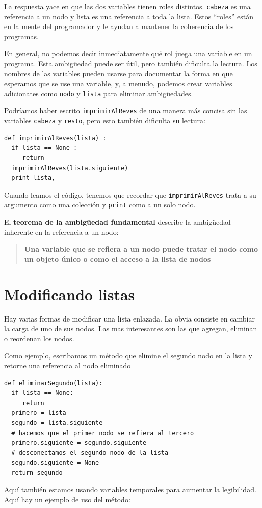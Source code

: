 La respuesta yace en que las dos variables tienen roles distintos. 
\texttt{cabeza} es una referencia a un nodo y lista es una referencia 
a toda la lista. Estos ``roles'' están en la mente del programador y 
le ayudan a mantener la coherencia de los programas.


En general, no podemos decir inmediatamente qué rol juega una variable
en un programa. Esta ambigüedad puede ser útil, pero también dificulta
la lectura. Los nombres de las variables pueden usarse para documentar
la forma en que esperamos que se use una variable, y, a menudo, podemos
crear variables adicionates como \texttt{nodo} y \texttt{lista} para 
eliminar ambigüedades.

Podríamos haber escrito  \texttt{imprimirAlReves} de una manera más
concisa sin las variables \texttt{cabeza}  y \texttt{resto}, pero esto
también dificulta su lectura:

\beforeverb
\begin{verbatim}
def imprimirAlReves(lista) :
  if lista == None : 
     return
  imprimirAlReves(lista.siguiente)
  print lista,
\end{verbatim}
\afterverb
%
Cuando leamos el código, tenemos que recordar que {\tt imprimirAlReves} 
trata a su argumento como una colección y  \texttt{print} como a un 
solo nodo.

El  {\bf teorema de la ambigüedad fundamental} describe la ambigüedad
inherente en la referencia a un nodo:

\begin{quote}
{\bf Una variable que se refiera a un nodo puede tratar el nodo como 
un objeto único o como el acceso a la lista de nodos}
\end{quote}



\section{Modificando listas}

Hay varias formas de modificar una lista enlazada. La obvia consiste en 
cambiar la carga de uno de sus nodos. Las mas interesantes son las que
agregan, eliminan o reordenan los nodos.

Como ejemplo, escribamos un método que elimine el segundo nodo en la 
lista y retorne una referencia al nodo eliminado

\beforeverb
\begin{verbatim}
def eliminarSegundo(lista):
  if lista == None: 
     return
  primero = lista
  segundo = lista.siguiente
  # hacemos que el primer nodo se refiera al tercero
  primero.siguiente = segundo.siguiente
  # desconectamos el segundo nodo de la lista
  segundo.siguiente = None
  return segundo
\end{verbatim}
\afterverb
%
Aquí también estamos usando variables temporales para aumentar la 
legibilidad. Aquí hay un ejemplo de uso del método:

